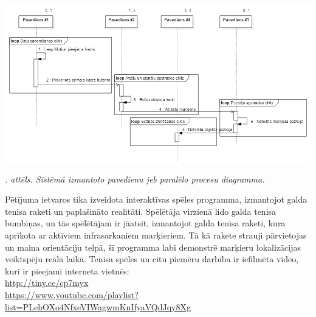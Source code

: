 \documentclass[12pt, a4paper, oneside, openright]{article}
\renewcommand{\thecimages}{\arabic{cimages}}
\begin{document}
\label{cimages:threading}
\vspace{10pt}
\begin{samepage}
\begin{center}
\includegraphics[width=0.9\columnwidth]{images/threading.png}
\begin{center}
\footnotesize{
\textit{\thecimages. attēls. Sistēmā izmantoto pavedienu jeb paralēlo procesu diagramma.}}
\end{center}
\end{center}
\end{samepage}


\newpage

Pētījuma ietvaros tika izveidota interaktīvas spēles programma, izmantojot galda tenisa raketi un paplašināto
realitāti. Spēlētāja virzienā lido galda tenisa bumbiņas, un tās spēlētājam ir jāatsit, izmantojot galda tenisa
raketi, kura aprīkota ar aktīviem infrasarkaniem marķieriem. Tā kā rakete strauji pārvietojas un maina
orientāciju telpā, šī programma labi demonstrē marķieru lokalizācijas veiktspēju reālā laikā.
Tenisa spēles un citu piemēru darbība ir iefilmēta video, kuri ir pieejami interneta vietnēs: \\
\url{http://tiny.cc/cp7myx} \\ \url{https://www.youtube.com/playlist?list=PLehOXo4NfxeVIWagwmKnIfyaVQdJqy8Xg}
\end{document}
